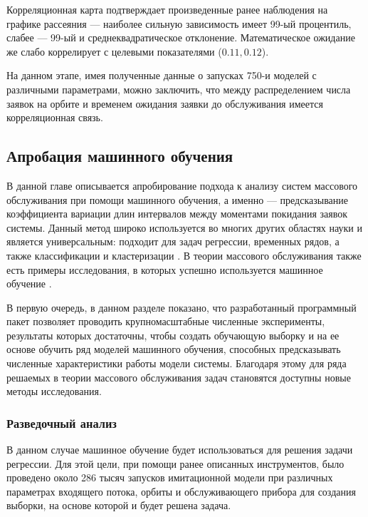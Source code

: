 Корреляционная карта подтверждает произведенные ранее наблюдения на графике рассеяния --- наиболее сильную зависимость имеет 99-ый процентиль, слабее --- 99-ый и среднеквадратическое отклонение. Математическое ожидание же слабо коррелирует с целевыми показателями ($0.11, 0.12$).

На данном этапе, имея полученные данные о запусках 750-и моделей с различными параметрами, можно заключить, что между распределением числа заявок на орбите и временем ожидания заявки до обслуживания имеется корреляционная связь.

\subsection{Апробация машинного обучения}
В данной главе описывается апробирование подхода к анализу систем массового обслуживания при помощи машинного обучения, а именно --- предсказывание коэффициента вариации длин интервалов между моментами покидания заявок системы. Данный метод широко используется во многих других областях науки и является универсальным: подходит для задач регрессии, временных рядов, а также классификации и кластеризации \cite{libbrecht2015machine,shinde2018review,soofi2017classification}. В теории массового обслуживания также есть примеры исследования, в которых успешно используется машинное обучение \cite{ojeda2021learning,xue2016scheduling,balla2018reliability}.

В первую очередь, в данном разделе показано, что разработанный программный пакет позволяет проводить крупномасштабные численные эксперименты, результаты которых достаточны, чтобы создать обучающую выборку и на ее основе обучить ряд моделей машинного обучения, способных предсказывать численные характеристики работы модели системы. Благодаря этому для ряда решаемых в теории массового обслуживания задач становятся доступны новые методы исследования.

\subsubsection{Разведочный анализ}
В данном случае машинное обучение будет использоваться для решения задачи регрессии. Для этой цели, при помощи ранее описанных инструментов, было проведено около 286 тысяч запусков имитационной модели при различных параметрах входящего потока, орбиты и обслуживающего прибора для создания выборки, на основе которой и будет решена задача.

